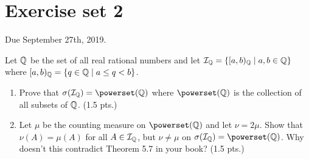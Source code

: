 \section{Exercise set 2}

Due September 27th, 2019.

\newcommand{\calI}{\mathcal{I}}
\begin{ex}
	Let $\mathbb{Q}$ be the set of all real rational numbers and let $\calI_\Q = \{[a, b)_\Q \mid a,b \in \Q\}$ where $[a,b)_{\mathbb{Q}} = \{q \in \mathbb{Q} \mid a \leq q < b\}$.
	\begin{enumerate}
		\item Prove that $\sigma(\calI_\Q) = \powerset(\Q)$ where $\powerset(\Q)$ is the collection of all subsets of $\mathbb{Q}$. (1.5 pts.)
		\item Let $\mu$ be the counting measure on $\powerset(\Q)$ and let $\nu = 2\mu$. Show that $\nu(A) = \mu(A)$ for all $A \in \calI_\Q$, but $\nu \neq \mu$ on $\sigma(\calI_\Q) = \powerset(\Q)$. Why doesn't this contradict Theorem 5.7 in your book? (1.5 pts.)
	\end{enumerate}
\end{ex}

